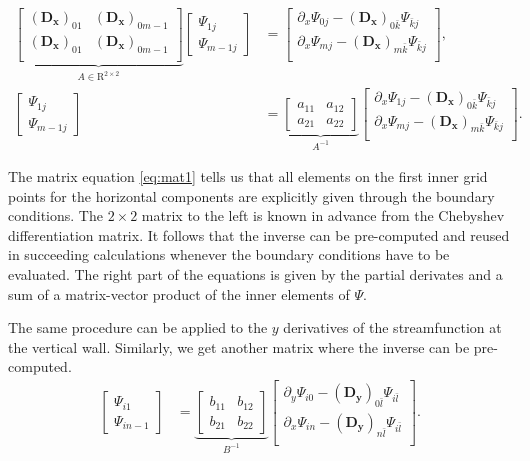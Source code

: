 \begin{align}
\underbrace{\begin{bmatrix} (\mathbf{D_x})_{01} & (\mathbf{D_x})_{0m-1} \\
    (\mathbf{D_x})_{01} & (\mathbf{D_x})_{0m-1} \\
\end{bmatrix}}_{A \in \mathrm{R}^{2 \times 2}}
\begin{bmatrix} \Psi_{1j} \\ \Psi_{m-1j}
\end{bmatrix} &=
\begin{bmatrix}
\partial_x\Psi_{0j} - (\mathbf{D_x})_{0\bar{k}}\Psi_{\bar{k}j} \\
\partial_x\Psi_{mj} - (\mathbf{D_x})_{m\bar{k}}\Psi_{\bar{k}j} \\
\end{bmatrix}, \nonumber \\
\begin{bmatrix} \Psi_{1j} \\ \Psi_{m-1j}
\end{bmatrix} &=
\underbrace{\begin{bmatrix} a_{11} & a_{12} \\ a_{21} & a_{22} 
\end{bmatrix}}_{A^{-1}}
\begin{bmatrix}
\partial_x\Psi_{1j} - (\mathbf{D_x})_{0\bar{k}}\Psi_{\bar{k}j} \\
\partial_x\Psi_{mj} - (\mathbf{D_x})_{m\bar{k}}\Psi_{\bar{k}j} \\
\end{bmatrix}.
\label{eq:mat1}
\end{align}

The matrix equation \eqref{eq:mat1} tells us that all elements on the first
inner grid points for the horizontal components are explicitly given through
the boundary conditions. The $2 \times 2$ matrix to the left is known in
advance from the Chebyshev differentiation matrix. It follows that the inverse
can be pre-computed and reused in succeeding calculations whenever the boundary
conditions have to be evaluated. The right part of the equations is given by
the partial derivates and a sum of a matrix-vector product of the inner
elements of $\Psi$.

The same procedure can be applied to the $y$ derivatives of the streamfunction
at the vertical wall. Similarly, we get another matrix where the inverse can be
pre-computed. 
\begin{align}
\begin{bmatrix} \Psi_{i1} \\ \Psi_{in-1}
\end{bmatrix} &=
\underbrace{\begin{bmatrix} b_{11} & b_{12} \\ b_{21} & b_{22} 
\end{bmatrix}}_{B^{-1}}
\begin{bmatrix}
\partial_y\Psi_{i0} - (\mathbf{D_y})_{0\bar{l}}\Psi_{i\bar{l}} \\
\partial_x\Psi_{in} - (\mathbf{D_y})_{n\bar{l}}\Psi_{i\bar{l}} \\
\end{bmatrix}.
\label{eq:mat2}
\end{align}

